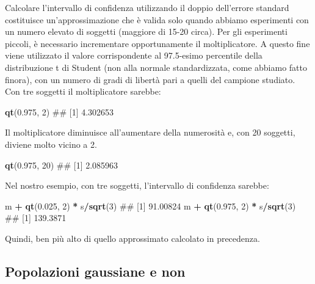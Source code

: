 \documentclass[a4paper,12pt,oneside]{book}
\newenvironment{Shaded}{\begin{snugshade}}{\end{snugshade}}
\newcommand{\KeywordTok}[1]{\textcolor[rgb]{0.13,0.29,0.53}{\textbf{#1}}}
\newcommand{\DecValTok}[1]{\textcolor[rgb]{0.00,0.00,0.81}{#1}}
\newcommand{\FloatTok}[1]{\textcolor[rgb]{0.00,0.00,0.81}{#1}}
\newcommand{\StringTok}[1]{\textcolor[rgb]{0.31,0.60,0.02}{#1}}
\newcommand{\OperatorTok}[1]{\textcolor[rgb]{0.81,0.36,0.00}{\textbf{#1}}}
\newcommand{\NormalTok}[1]{#1}
\theoremstyle{definition}
\theoremstyle{definition}
\theoremstyle{definition}
\theoremstyle{remark}
\begin{document}
Calcolare l'intervallo di confidenza utilizzando il doppio dell'errore
standard costituisce un'approssimazione che è valida solo quando abbiamo
esperimenti con un numero elevato di soggetti (maggiore di 15-20 circa).
Per gli esperimenti piccoli, è necessario incrementare opportunamente il
moltiplicatore. A questo fine viene utilizzato il valore corrispondente
al 97.5-esimo percentile della distribuzione t di Student (non alla
normale standardizzata, come abbiamo fatto finora), con un numero di
gradi di libertà pari a quelli del campione studiato. Con tre soggetti
il moltiplicatore sarebbe:

\begin{Shaded}
\begin{Highlighting}[]
\KeywordTok{qt}\NormalTok{(}\FloatTok{0.975}\NormalTok{, }\DecValTok{2}\NormalTok{)}
\NormalTok{## [1] 4.302653}
\end{Highlighting}
\end{Shaded}

Il moltiplicatore diminuisce all'aumentare della numerosità e, con 20
soggetti, diviene molto vicino a 2.

\begin{Shaded}
\begin{Highlighting}[]
\KeywordTok{qt}\NormalTok{(}\FloatTok{0.975}\NormalTok{, }\DecValTok{20}\NormalTok{)}
\NormalTok{## [1] 2.085963}
\end{Highlighting}
\end{Shaded}

Nel nostro esempio, con tre soggetti, l'intervallo di confidenza
sarebbe:

\begin{Shaded}
\begin{Highlighting}[]
\NormalTok{m }\OperatorTok{+}\StringTok{ }\KeywordTok{qt}\NormalTok{(}\FloatTok{0.025}\NormalTok{, }\DecValTok{2}\NormalTok{) }\OperatorTok{*}\StringTok{ }\NormalTok{s}\OperatorTok{/}\KeywordTok{sqrt}\NormalTok{(}\DecValTok{3}\NormalTok{)}
\NormalTok{## [1] 91.00824}
\NormalTok{m }\OperatorTok{+}\StringTok{ }\KeywordTok{qt}\NormalTok{(}\FloatTok{0.975}\NormalTok{, }\DecValTok{2}\NormalTok{) }\OperatorTok{*}\StringTok{ }\NormalTok{s}\OperatorTok{/}\KeywordTok{sqrt}\NormalTok{(}\DecValTok{3}\NormalTok{)}
\NormalTok{## [1] 139.3871}
\end{Highlighting}
\end{Shaded}

Quindi, ben più alto di quello approssimato calcolato in precedenza.

\subsection{Popolazioni gaussiane e
non}\label{popolazioni-gaussiane-e-non}
\end{document}
